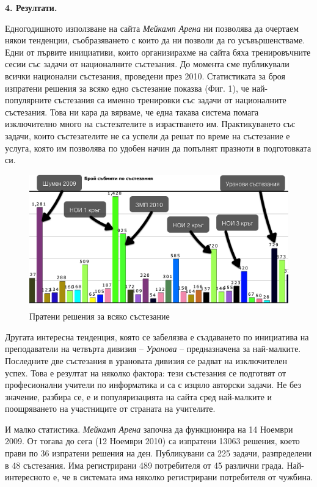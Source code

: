 \documentclass[11pt]{article}
\begin{document}
\textbf{4. Резултати.}

Едногодишното използване на сайта \textit{Мейкамп Арена} ни
позволява да очертаем някои тенденции, съобразяването с които да ни
позволи да го усъвършенстваме. Едни от първите инициативи, които
организирахме на сайта бяха тренировъчните сесии със задачи от
националните състезания. До момента сме публикували всички национални
състезания, проведени през 2010. Статистиката за броя изпратени
решения за всяко едно състезание показва (Фиг. 1), че
най-популярните състезания са именно тренировки със задачи от
националните състезания. Това ни кара да вярваме, че една такава
система помага изключително много на състезателите в израстването
им. Практикуването със задачи, които състезателите не са успели да
решат по време на състезание е услуга, която им позволява по удобен
начин да попълнят празноти в подготовката си.

\begin{figure}[h]
\begin{center}
\includegraphics[width=1.0\textwidth]{contest_stats_small.png}
\end{center}
\caption{Пратени решения за всяко състезание} \label{contest_stats}
\end{figure}

Другата интересна тенденция, която се забелязва е създаването по
инициатива на преподаватели на четвърта дивизия -- \textit{Уранова}
-- предназначена за най-малките. Последните две състезания в
урановата дивизия се радват на изключителен успех. Това е резултат
на няколко фактора: тези състезания се подготвят от професионални
учители по информатика и са с изцяло авторски задачи. Не без
значение, разбира се, е и популяризацията на сайта сред най-малките
и поощряването на участниците от страната на учителите.

И малко статистика. \textit{Мейкамп Арена} започна да функционира на
14 Ноември 2009. От тогава до сега (12 Ноември 2010) са изпратени
13063 решения, което прави по 36 изпратени решения на ден.
Публикувани са 225 задачи, разпределени в 48 състезания. Има
регистрирани 489 потребителя от 45 различни града. Най-интересното
е, че в системата има няколко регистрирани потребителя от чужбина.
\end{document}
